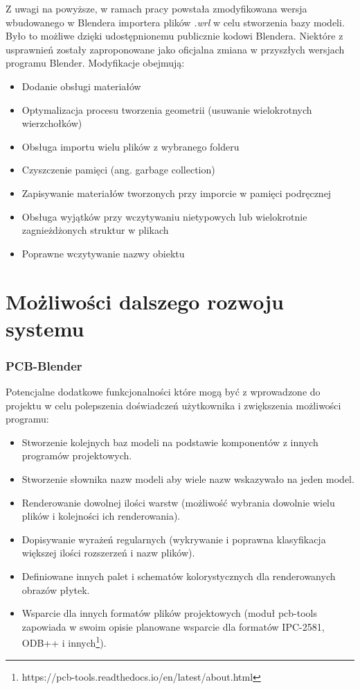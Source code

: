 \documentclass{xmgr}
\begin{document}
Z uwagi na powyższe, w ramach pracy powstała zmodyfikowana wersja wbudowanego w Blendera importera plików \emph{.wrl} w celu stworzenia bazy modeli. Było to możliwe dzięki udostępnionemu publicznie kodowi Blendera. Niektóre z usprawnień zostały zaproponowane jako oficjalna zmiana w przyszłych wersjach programu Blender. Modyfikacje obejmują:
\begin{itemize}
\item Dodanie obsługi materiałów
\item Optymalizacja procesu tworzenia geometrii (usuwanie wielokrotnych wierzchołków)
\item Obsługa importu wielu plików z wybranego folderu
\item Czyszczenie pamięci (ang. garbage collection)
\item Zapisywanie materiałów tworzonych przy imporcie w pamięci podręcznej
\item Obsługa wyjątków przy wczytywaniu nietypowych lub wielokrotnie zagnieżdżonych struktur w plikach
\item Poprawne wczytywanie nazwy obiektu
\end{itemize}

\section{Możliwości dalszego rozwoju systemu}
\subsubsection{PCB-Blender}
Potencjalne dodatkowe funkcjonalności które mogą być z wprowadzone do projektu w celu polepszenia doświadczeń użytkownika i zwiększenia możliwości programu:
\begin{itemize}
\item Stworzenie kolejnych baz modeli na podstawie komponentów z innych programów projektowych.
\item Stworzenie słownika nazw modeli aby wiele nazw wskazywało na jeden model.
\item Renderowanie dowolnej ilości warstw (możliwość wybrania dowolnie wielu plików i kolejności ich renderowania).
\item Dopisywanie wyrażeń regularnych (wykrywanie i poprawna klasyfikacja większej ilości rozszerzeń i nazw plików).
\item Definiowane innych palet i schematów kolorystycznych dla renderowanych obrazów płytek.
\item Wsparcie dla innych formatów plików projektowych (moduł pcb-tools zapowiada w swoim opisie planowane wsparcie dla formatów IPC-2581, ODB++ i innych\footnote{https://pcb-tools.readthedocs.io/en/latest/about.html}).
\end{itemize}
\end{document}
